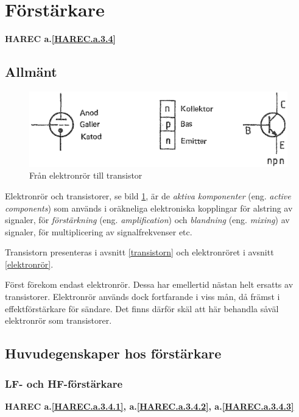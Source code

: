 \section{Förstärkare}
\textbf{HAREC a.\ref{HAREC.a.3.4}\label{myHAREC.a.3.4}}

\subsection{Allmänt}

\begin{figure}
\includegraphics[width=\textwidth]{images/cropped_pdfs/bild_2_3-40.pdf}
\caption{Från elektronrör till transistor}
\label{fig:BildII3-40}
\end{figure}

Elektronrör och transistorer, se bild \ref{fig:BildII3-40}, är de
\emph{aktiva komponenter} (eng. \emph{active components}) som används i
oräkneliga elektroniska kopplingar för alstring av signaler, för
\emph{förstärkning} (eng. \emph{amplification}) och \emph{blandning} (eng.
\emph{mixing}) av signaler, för multiplicering av signalfrekvenser etc.

Transistorn presenteras i avsnitt \ref{transistorn} och elektronröret i avsnitt \ref{elektronrör}.

Först förekom endast elektronrör.
Dessa har emellertid nästan helt ersatts av transistorer.
Elektronrör används dock fortfarande i viss mån, då främst i effektförstärkare
för sändare.
Det finns därför skäl att här behandla såväl elektronrör som transistorer.

\subsection{Huvudegenskaper hos förstärkare}
\subsubsection{LF- och HF-förstärkare}
\textbf{HAREC a.\ref{HAREC.a.3.4.1}, a.\ref{HAREC.a.3.4.2}, a.\ref{HAREC.a.3.4.3}\label{myHAREC.a.3.4.1}\label{myHAREC.a.3.4.2}\label{myHAREC.a.3.4.3}}

